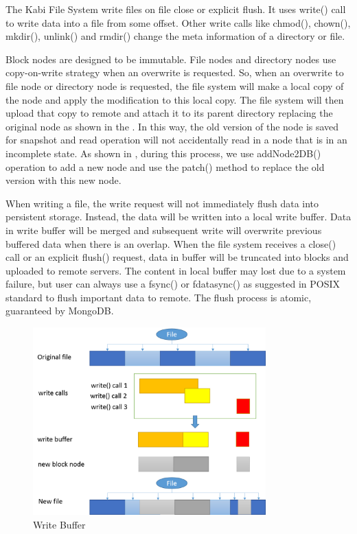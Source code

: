     The Kabi File System write files on file close or explicit flush. It uses write() call to write data into a file from some offset. Other write calls like chmod(), chown(), mkdir(), unlink() and rmdir() change the meta information of a directory or file.

    Block nodes are designed to be immutable. File nodes and directory nodes use copy-on-write strategy when an overwrite is requested. So, when an overwrite to file node or directory node is requested, the file system will make a local copy of the node and apply the modification to this local copy. The file system will then upload that copy to remote and attach it to its parent directory replacing the original node as shown in the . In this way, the old version of the node is saved for snapshot and read operation will not accidentally read in a node that is in an incomplete state. As shown in , during this process, we use addNode2DB() operation to add a new node and use the patch() method to replace the old version with this new node.

	When writing a file, the write request will not immediately flush data into persistent storage. Instead, the data will be written into a local write buffer. Data in write buffer will be merged and subsequent write will overwrite previous buffered data when there is an overlap. When the file system receives a close() call or an explicit flush() request, data in buffer will be truncated into blocks and uploaded to remote servers. The content in local buffer may lost due to a system failure, but user can always use a fsync() or fdatasync() as suggested in POSIX standard to flush important data to remote. The flush process is atomic, guaranteed by MongoDB. 

\begin{figure}[t]
\centering
\includegraphics[width=0.8\textwidth]{Chapter-3/figs/fig11.png}
\caption{Write Buffer}
\label{fig:buffer}
\end{figure}

